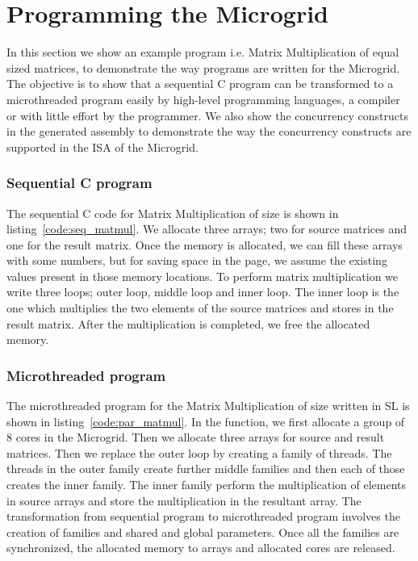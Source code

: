 \documentclass{article}
\begin{document}
\section{Programming the Microgrid}\label{sn:program_microgrids}

In this section we show an example program i.e. Matrix Multiplication of equal
sized matrices, to demonstrate the way programs are written for the Microgrid.
The objective is to show that a sequential C program can be transformed to a
microthreaded program easily by high-level programming languages, a compiler or
with little effort by the programmer. We also show the concurrency constructs
in the generated assembly to demonstrate the way the concurrency constructs are
supported in the ISA of the Microgrid.

\subsubsection*{Sequential C program}

The sequential C code for Matrix Multiplication of size  is
shown in listing~\ref{code:seq_matmul}. We allocate three arrays; two for
source matrices and one for the result matrix. Once the memory is allocated, we
can fill these arrays with some numbers, but for saving space in the page, we
assume the existing values present in those memory locations. To perform matrix
multiplication we write three loops; outer loop, middle loop and inner loop.
The inner loop is the one which multiplies the two elements of the source
matrices and stores in the result matrix. After the multiplication is
completed, we free the allocated memory.

\begin{figure}
\begin{minipage}{\textwidth}
\scriptsize
\lstset{float, language=C, caption=Sequential execution of Matrix Multiplication.,
label=code:seq_matmul} 
\end{minipage}
\end{figure}

\subsubsection*{Microthreaded program}

The microthreaded program for the Matrix Multiplication of size  written in SL is shown in listing~\ref{code:par_matmul}. In the 
function, we first allocate a group of 8 cores in the Microgrid. Then we
allocate three arrays for source and result matrices. Then we replace the outer
loop by creating a family of  threads. The threads in the outer family
create further middle families and then each of those creates the inner family.
The inner family perform the multiplication of elements in source arrays and
store the multiplication in the resultant array. The transformation from
sequential program to microthreaded program involves the creation of families
and shared and global parameters. Once all the families are synchronized, the
allocated memory to arrays and allocated cores are released.
\end{document}
